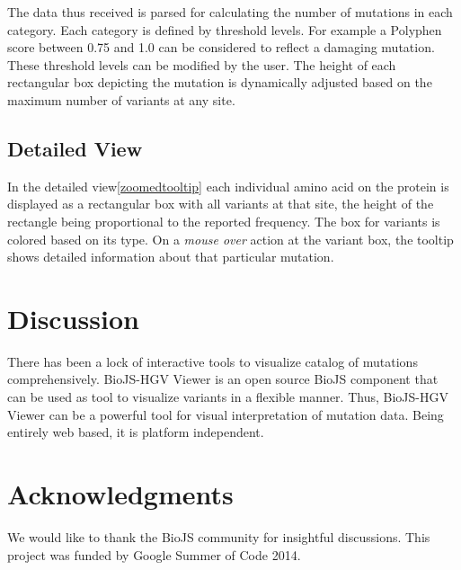 \documentclass[twoside]{article}
\begin{document}
\begin{multicols}{2}
The data thus received is parsed for calculating the number of mutations in each category. Each category is defined by threshold levels. For example a Polyphen score between 0.75 and 1.0 can be considered to reflect a damaging mutation. These threshold levels can be modified by the user. The height of each rectangular box depicting the mutation is dynamically adjusted based on the maximum number of variants at any site.


\subsection{Detailed View}
In the detailed view\ref{zoomedtooltip} each individual amino acid on the protein is displayed as a rectangular box with all variants at that site, the height of the rectangle being proportional to the reported frequency. The box for variants is colored based on its type. On a \textit{mouse over} action at the variant box, the tooltip shows detailed information about that particular mutation.


\section{Discussion}
There has been a lock of interactive tools to visualize catalog of mutations comprehensively. BioJS-HGV Viewer is an open source BioJS component that can be used as tool to visualize variants in a flexible manner. Thus, BioJS-HGV Viewer can be a powerful tool for visual interpretation of mutation data. Being entirely web based, it is platform independent.




\section{Acknowledgments}
We would like to thank the BioJS community for insightful discussions. This project was funded by Google Summer of Code 2014.





\end{multicols}
\end{document}

